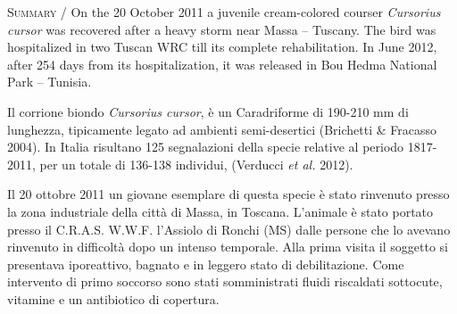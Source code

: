 {\small
\noindent \textsc{\color{MUSEBLUE} Summary} / On the 20 October 2011 a juvenile cream-colored courser
\textit{Cursorius cursor} was recovered after a heavy storm near Massa
-- Tuscany. The bird was hospitalized in two Tuscan WRC till its
complete rehabilitation. In June 2012, after 254 days from its
hospitalization, it was released in Bou Hedma National Park -- Tunisia.\\
}

\vspace{1cm}
Il corrione biondo \textit{Cursorius cursor}, \`e un Caradriforme di
190-210 mm di lunghezza, tipicamente legato ad ambienti semi-desertici
(Brichetti \& Fracasso 2004). In Italia risultano 125 segnalazioni
della specie relative al periodo 1817-2011, per un totale di 136-138
individui, (Verducci \textit{et al.} 2012). 

Il 20 ottobre 2011 un giovane esemplare di questa specie \`e stato
rinvenuto presso la zona industriale della citt\`a di Massa, in
Toscana. L{\textquoteright}animale \`e stato portato presso il C.R.A.S. W.W.F.
l{\textquoteright}Assiolo di Ronchi (MS) dalle persone che lo avevano
rinvenuto in difficolt\`a dopo un intenso temporale. Alla prima visita
il soggetto si presentava iporeattivo, bagnato e in leggero stato di
debilitazione. Come intervento di primo soccorso sono stati
somministrati fluidi riscaldati sottocute, vitamine e un antibiotico di
copertura.

